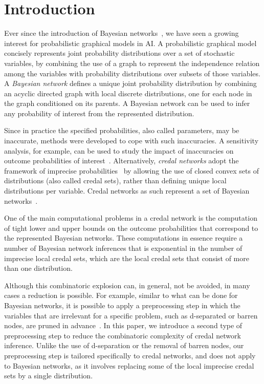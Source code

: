 \documentclass[10pt,a4paper]{paper}
\theoremstyle{definition}
\begin{document}
\section{Introduction}\label{sec:introduction}
Ever since the introduction of Bayesian networks~\cite{Pearl:1988wk}, we have seen a growing interest for probabilistic graphical models in AI. A probabilistic graphical model concisely represents joint probability distributions over a set of stochastic variables, by combining the use of a graph to represent the independence relation among the variables with probability distributions over subsets of those variables. A \emph{Bayesian network} defines a unique joint probability distribution by combining an acyclic directed graph with local discrete distributions, one for each node in the graph conditioned on its parents. A Bayesian network can be used to infer any probability of interest from the represented distribution. 

Since in practice the specified probabilities, also called parameters, may be inaccurate, methods were developed to cope with such inaccuracies. A sensitivity analysis, for example, can be used to study the impact of inaccuracies on outcome probabilities of interest~\cite{Kjaerulff:2000ui}. Alternatively, \emph{credal networks} adopt the framework of imprecise probabilities~\cite{augustin2013:itip,Walley:1991vk} by allowing the use of closed convex sets of distributions (also called credal sets), rather than defining unique local distributions per variable. Credal networks as such represent a set of Bayesian networks~\cite{Antonucci:2014ty,Cozman:2000ug,Cozman:2005ct}. 

One of the main computational problems in a credal network is the computation of tight lower and upper bounds on the outcome probabilities that correspond to the represented Bayesian networks. These computations in essence require a number of Bayesian network inferences that is exponential in the number of imprecise local credal sets, which are the local credal sets that consist of more than one distribution. 

Although this combinatoric explosion can, in general, not be avoided, in many cases a reduction is possible. For example, similar to what can be done for Bayesian networks, it is possible to apply a preprocessing step in which the variables that are irrelevant for a specific problem, such as d-separated or barren nodes, are pruned in advance~\cite{Cozman:2000ug}. In this paper, we introduce a second type of preprocessing step to reduce the combinatoric complexity of credal network inference. Unlike the use of d-separation or the removal of barren nodes, our preprocessing step is tailored specifically to credal networks, and does not apply to Bayesian networks, as it involves replacing some of the local imprecise credal sets by a single distribution.
\end{document}
